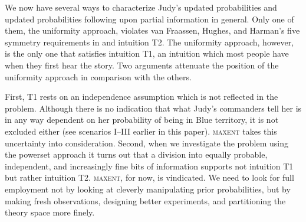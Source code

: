 \documentclass[12pt]{article}
\begin{document}
We now have several ways to characterize Judy's updated
probabilities and updated probabilities following upon partial
information in general. Only one of them, the uniformity approach,
violates van Fraassen, Hughes, and Harman's five symmetry requirements
in  and intuition T2. The uniformity
approach, however, is the only one that satisfies intuition T1, an
intuition which most people have when they first hear the story. Two
arguments attenuate the position of the uniformity approach in
comparison with the others. 

First, T1 rests on an independence assumption which is not reflected
in the problem. Although there is no indication that what Judy's
commanders tell her is in any way dependent on her probability of
being in Blue territory, it is not excluded either (see scenarios
I--III earlier in this paper). \textsc{maxent} takes this uncertainty
into consideration. Second, when we investigate the problem using the
powerset approach it turns out that a division into equally probable,
independent, and increasingly fine bits of information supports not
intuition T1 but rather intuition T2. \textsc{maxent}, for now, is
vindicated. We need to look for full employment not by looking at
cleverly manipulating prior probabilities, but by making fresh
observations, designing better experiments, and partitioning the
theory space more finely.





\end{document}
